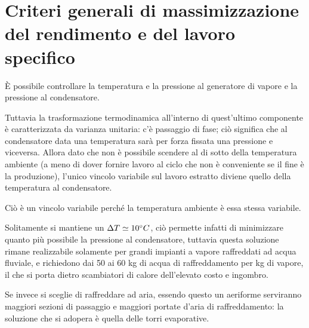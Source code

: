 \section{Criteri generali di massimizzazione del rendimento e del lavoro specifico}
\begin{adjustwidth}{2in}{}
	È possibile controllare la temperatura e la pressione al generatore di vapore e la pressione al condensatore. \newline
	
	Tuttavia la trasformazione termodinamica all'interno di quest'ultimo componente è caratterizzata da varianza unitaria: c'è passaggio di fase; ciò significa che al condensatore data una temperatura sarà per forza fissata una pressione e viceversa. Allora dato che non è possibile scendere al di sotto della temperatura ambiente {\footnotesize (a meno di dover fornire lavoro al ciclo che non è conveniente se il fine è la produzione)}, l'unico vincolo variabile sul lavoro estratto diviene quello della temperatura al condensatore. 
	
	Ciò è un vincolo variabile perché la temperatura ambiente è essa stessa variabile. \newline
	
	Solitamente si mantiene un $\Delta T \simeq 10\degree C$, ciò permette infatti di minimizzare quanto più possibile la pressione al condensatore, tuttavia questa soluzione rimane realizzabile solamente per grandi impianti a vapore raffreddati ad acqua fluviale, e richiedono dai 50 ai 60 kg di acqua di raffreddamento per kg di vapore, il che si porta dietro scambiatori di calore dell'elevato costo e ingombro.
	
	Se invece si sceglie di raffreddare ad aria, essendo questo un aeriforme serviranno maggiori sezioni di passaggio e maggiori portate d'aria di raffreddamento: la soluzione che si adopera è quella delle torri evaporative. 
\end{adjustwidth}



